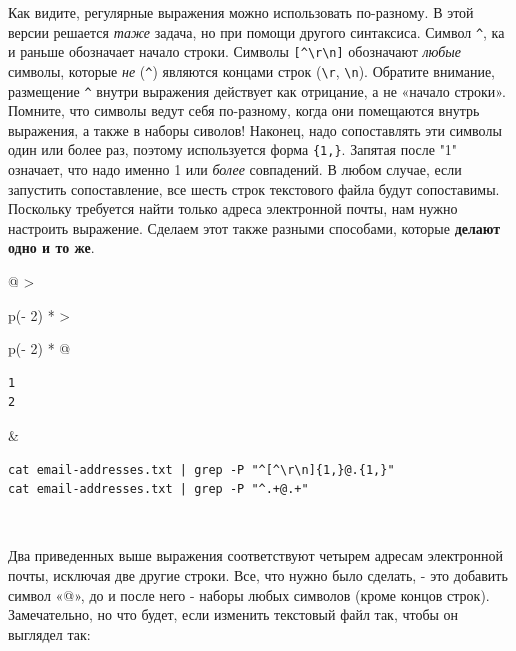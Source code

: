 \documentclass{report}
\begin{document}
Как видите, регулярные выражения можно использовать по-разному. В этой
версии решается \emph{таже} задача, но при помощи другого синтаксиса.
Символ \texttt{\^{}}, ка и раньше обозначает начало строки. Символы
\texttt{{[}\^{}\textbackslash{}r\textbackslash{}n{]}} обозначают
\emph{любые} символы, которые \emph{не} (\texttt{\^{}}) являются концами
строк (\texttt{\textbackslash{}r}, \texttt{\textbackslash{}n}). Обратите
внимание, размещение \texttt{\^{}} внутри выражения действует как
отрицание, а не «начало строки». Помните, что символы ведут себя
по-разному, когда они помещаются внутрь выражения, а также в наборы
сиволов! Наконец, надо сопоставлять эти символы один или более раз,
поэтому используется форма \texttt{\{1,\}}. Запятая после "1" означает,
что надо именно 1 или \emph{более} совпадений. В любом случае, если
запустить сопоставление, все шесть строк текстового файла будут
сопоставимы. Поскольку требуется найти только адреса электронной почты,
нам нужно настроить выражение. Сделаем этот также разными способами,
которые \textbf{делают одно и то же}.

\begin{longtable}[]{@{}
  >{\raggedright\arraybackslash}p{(\columnwidth - 2\tabcolsep) * }
  >{\raggedright\arraybackslash}p{(\columnwidth - 2\tabcolsep) * }@{}}
\toprule
\endhead
\begin{minipage}[t]{\linewidth}\raggedright
\begin{verbatim}
1
2
\end{verbatim}
\end{minipage} & \begin{minipage}[t]{\linewidth}\raggedright
\begin{verbatim}
cat email-addresses.txt | grep -P "^[^\r\n]{1,}@.{1,}"
cat email-addresses.txt | grep -P "^.+@.+"
\end{verbatim}
\end{minipage} \\ \addlinespace
\bottomrule
\end{longtable}

Два приведенных выше выражения соответствуют четырем адресам электронной
почты, исключая две другие строки. Все, что нужно было сделать, - это
добавить символ «@», до и после него - наборы любых символов (кроме
концов строк). Замечательно, но что будет, если изменить текстовый файл
так, чтобы он выглядел так:
\end{document}
